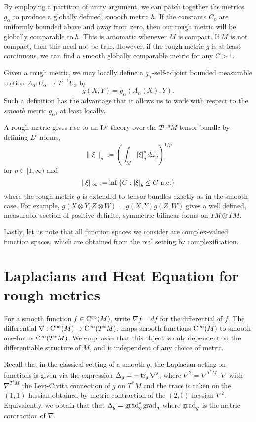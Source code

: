 \documentclass[a4paper, 12pt]{amsart}
\begin{document}
\begin{rem}
By employing a partition of unity argument, we can patch together the metrics \(g_{\alpha}\) to produce a globally defined, smooth metric \(h\). If the constants \(C_{\alpha}\) are uniformly bounded above and away from zero, then our rough metric will be globally comparable to \(h\). This is automatic whenever \(M\) is compact. If \(M\) is not compact, then this need not be true.
However, if the rough metric $g$ is at least continuous, we can find a smooth globally comparable metric for any $C > 1$. 
\end{rem}

Given a rough metric, we may locally define a \(g_{\alpha}\)-self-adjoint bounded measurable section \(A_{\alpha} : U_{\alpha} \to T^{1,1}U_{\alpha}\) by
\[
g(X, Y) = g_{\alpha} (A_{\alpha} (X), Y).
\]
Such a definition has the advantage that it allows us to work with respect to the \emph{smooth} metric \(g_{\alpha}\), 
at least locally.

A rough metric gives rise to an ${\rm L}^{p}_{\rm {}}$-theory over the $T^{p,q}M$ tensor bundle by defining \(L^p\) norms,
\[
\|\xi\|_p := \left(\int_{M} |\xi|_{g}^p\ d\omega_g\right)^{1/p}
\]
for $p \in [1, \infty)$ and
\[
\|\xi\|_{\infty} := \inf\left\{C: |\xi|_g \leq C\ \text{a.e.}\right\}
\]
where the rough metric \(g\) is extended to tensor bundles exactly as in the smooth case. For example, \(g(X \otimes Y, Z \otimes W) = g(X, Y) g(Z, W)\) gives a well defined, measurable section of positive definite, symmetric bilinear forms on \(TM \otimes TM\).

Lastly, let us note that all function spaces we consider are complex-valued function spaces, which are obtained from the real setting by complexification.


\section{Laplacians and Heat Equation for rough metrics}


For a smooth function \(f \in {\rm C}^{\infty}_{\rm {}}(M)\), write \(\nabla f = df\) for the differential of \(f\). 
The differential \(\nabla : {\rm C}^{\infty}_{\rm {}}(M) \to {\rm C}^{\infty}_{\rm {}}(T^{\ast} M)\), maps smooth functions 
\({\rm C}^{\infty}_{\rm {}}(M)\) to smooth one-forms \({\rm C}^{\infty}_{\rm {}}(T^{\ast} M)\). 
We emphasise that this object is only dependent on the differentiable structure of $M$, and is independent of any choice of metric.

Recall that in the classical setting of a smooth $g$,  the Laplacian acting on functions is given  via the expression $\Delta_g = - \operatorname{tr}_g \nabla^2$, where $\nabla^2 = \nabla^{T^\ast M} \comp \nabla$
with $\nabla^{T^\ast M}$ the Levi-Civita connection of $g$ on \(T^{\ast} M\) and the trace is taken on the \((1,1)\) hessian obtained by metric contraction of the \((2, 0)\) hessian \(\nabla^2\). Equivalently, we obtain that  that \(\Delta_g = \operatorname{grad}_g^\ast \operatorname{grad}_g\) where \(\operatorname{grad}_g\) is the metric contraction of \(\nabla\).
\end{document}
